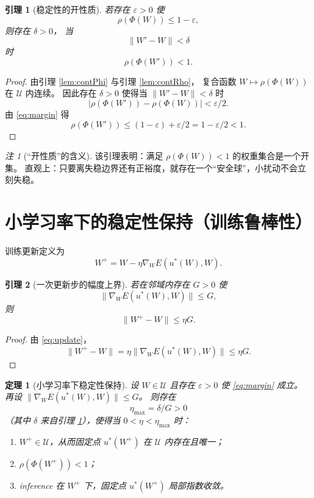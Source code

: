 \documentclass[11pt]{article}
\theoremstyle{plain}
\newtheorem{theorem}{定理}
\newtheorem{lemma}{引理}
\theoremstyle{remark}
\newtheorem{remark}{注}
\begin{document}
\begin{lemma}[稳定性的开性质]\label{lem:open}
若存在 $\varepsilon>0$ 使
\begin{equation}\label{eq:margin}
\rho(\Phi(W))\le 1-\varepsilon,
\end{equation}
则存在 $\delta>0$，
当
\[
\|W'-W\|<\delta
\]
时
\[
\rho(\Phi(W'))<1.
\]
\end{lemma}

\begin{proof}
由引理 \ref{lem:contPhi} 与引理 \ref{lem:contRho}，
复合函数 $W\mapsto \rho(\Phi(W))$ 在 $\mathcal U$ 内连续。
因此存在 $\delta>0$ 使得当 $\|W'-W\|<\delta$ 时
\[
|\rho(\Phi(W'))-\rho(\Phi(W))|<\varepsilon/2.
\]
由 \eqref{eq:margin} 得
\[
\rho(\Phi(W'))\le (1-\varepsilon)+\varepsilon/2=1-\varepsilon/2<1.
\]
\end{proof}

\begin{remark}[“开性质”的含义]
该引理表明：满足 $\rho(\Phi(W))<1$ 的权重集合是一个开集。
直观上：只要离失稳边界还有正裕度，就存在一个“安全球”，小扰动不会立刻失稳。
\end{remark}

\section{小学习率下的稳定性保持（训练鲁棒性）}

训练更新定义为
\begin{equation}\label{eq:update}
W^+=W-\eta \nabla_W E(u^*(W),W).
\end{equation}

\begin{lemma}[一次更新步的幅度上界]\label{lem:step}
若在邻域内存在 $G>0$ 使
\[
\|\nabla_W E(u^*(W),W)\|\le G,
\]
则
\[
\|W^+-W\|\le \eta G.
\]
\end{lemma}

\begin{proof}
由 \eqref{eq:update}，
\[
\|W^+-W\|=\eta\|\nabla_W E(u^*(W),W)\|\le \eta G.
\]
\end{proof}

\begin{theorem}[小学习率下稳定性保持]\label{thm:robust}
设 $W\in\mathcal U$ 且存在 $\varepsilon>0$ 使 \eqref{eq:margin} 成立。
再设 $\|\nabla_W E(u^*(W),W)\|\le G$。
则存在
\[
\eta_{\max}=\delta/G>0
\]
（其中 $\delta$ 来自引理 \ref{lem:open}），使得当 $0<\eta<\eta_{\max}$ 时：

\begin{enumerate}
\item $W^+\in\mathcal U$，从而固定点 $u^*(W^+)$ 在 $\mathcal U$ 内存在且唯一；
\item $\rho(\Phi(W^+))<1$；
\item inference 在 $W^+$ 下，固定点 $u^*(W^+)$ 局部指数收敛。
\end{enumerate}
\end{theorem}
\end{document}
